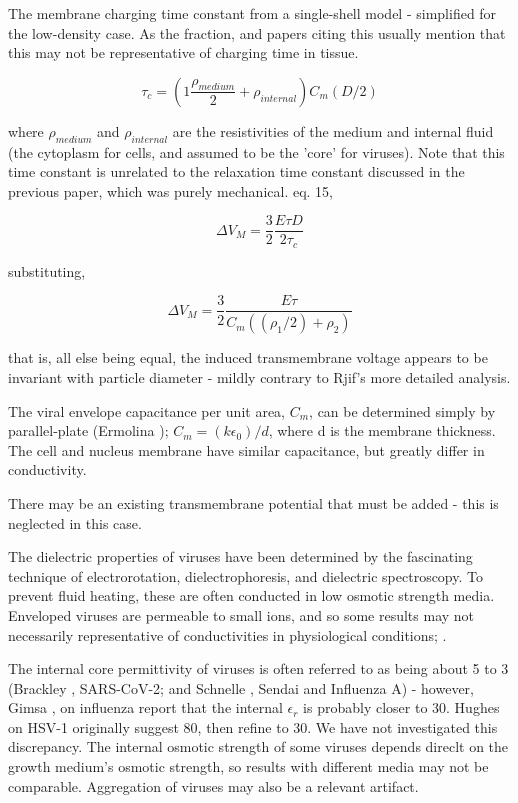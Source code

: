 \documentclass[fleqn,10pt]{paper}
\begin{document}
The membrane charging time constant from a single-shell model \cite{Ultrashort2004} - simplified for the low-density case. As the fraction, and papers citing this usually mention that this may not be representative of charging time in tissue.

$$\tau_c = \left(1 \frac{\rho_{medium}}{2} + \rho_{internal}\right) C_m (D/2)$$

where $\rho_{medium}$ and $\rho_{internal}$ are the resistivities of the medium and internal fluid (the cytoplasm for cells, and assumed to be the 'core' for viruses). Note that this time constant is unrelated to the relaxation time constant discussed in the previous paper, which was purely mechanical. \cite{Bioelectric2007} eq. 15, 

$$\Delta V_M = \frac{3}{2}\frac{E\tau D}{2 \tau_c }$$

substituting,

$$\Delta V_M = \frac{3}{2}\frac{E \tau}{C_m ((\rho_1/2) + \rho_2)}$$

that is, all else being equal, the induced transmembrane voltage appears to be invariant with particle diameter - mildly contrary to Rjif's more detailed analysis.

The viral envelope capacitance per unit area, $C_m$, can be determined simply by parallel-plate (Ermolina \cite{Study2001}); $C_m = (k\epsilon_0) / d$, where d is the membrane thickness. The cell and nucleus membrane have similar capacitance, but greatly differ in conductivity. 

There may be an existing transmembrane potential that must be added - this is neglected in this case.

The dielectric properties of viruses have been determined by the fascinating technique of electrorotation, dielectrophoresis, and dielectric spectroscopy. To prevent fluid heating, these are often conducted in low osmotic strength media. Enveloped viruses are permeable to small ions, and so some results may not necessarily representative of conductivities in physiological conditions; \cite{Assessment}.

The internal core permittivity of viruses is often referred to as being about 5 to 3 (Brackley \cite{Electrostatic2020}, SARS-CoV-2; and Schnelle \cite{Trapping1996}, Sendai and Influenza A) - however, Gimsa \cite{New1999}, on influenza report that the internal $\epsilon_r$ is probably closer to 30. Hughes on HSV-1 originally suggest 80\cite{Manipulation1998}, then refine to 30\cite{Dielectrophoretic2001}. We have not investigated this discrepancy. The internal osmotic strength of some viruses depends direclt on the growth medium's osmotic strength\cite{Osmotic2003}, so results with different media may not be comparable. Aggregation of viruses may also be a relevant artifact. 
\end{document}
